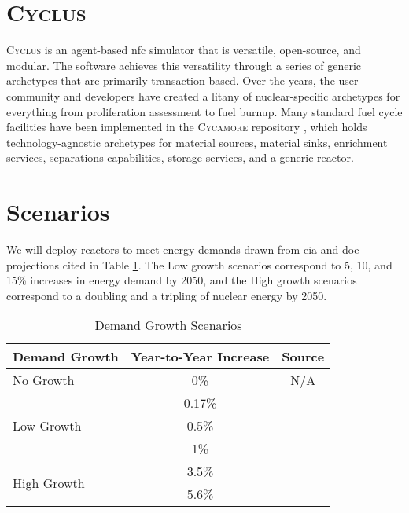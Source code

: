 \documentclass{anstrans}
\newcommand{\cycamore}{\textsc{Cycamore}\xspace}
\newcommand{\cyclus}{\textsc{Cyclus}\xspace}
\begin{document}
\section{\cyclus}

\cyclus \cite{huff_cyclus_intro_2016} is an agent-based \gls{nfc} simulator
that is versatile, open-source, and modular. The software achieves this
versatility through a series of generic archetypes that are primarily
transaction-based. Over the years, the user community and developers have
created a litany of nuclear-specific archetypes for everything from
proliferation assessment to fuel burnup. Many standard fuel cycle facilities
have been implemented in the \cycamore repository \cite{Carlsen_cycamore_2014},
which holds technology-agnostic archetypes for material sources, material
sinks, enrichment services, separations capabilities, storage services, and a
generic reactor.


\section{Scenarios}
We will deploy reactors to meet energy demands drawn from \gls{eia} and \gls{doe} projections cited in Table \ref{tab:demand_scenarios}. The Low growth scenarios correspond to 5, 10, and 15\% increases in energy demand by 2050, and the High growth scenarios correspond to a doubling and a tripling of nuclear energy by 2050.

\begin{table}[h]
  \centering
  \caption{Demand Growth Scenarios}
  \label{tab:demand_scenarios}
  \begin{tabular}{l c c}
      \hline
      \textbf{Demand Growth} & \textbf{Year-to-Year Increase} & \textbf{Source}\\
      \hline
      No Growth & 0\% & N/A\\
      \multirow{3}{*}{Low Growth} & 0.17\% & \cite{eia_aeo_2023}\\
       & 0.5\% & \cite{eia_aeo_2023}\\
       & 1\% & \cite{eia_aeo_2023}\\
       \multirow{2}{*}{High Growth} & 3.5\% & \cite{julie_liftoff_pathways_2024} \\
       & 5.6\% & \cite{julie_liftoff_pathways_2024}\\
      \hline
  \end{tabular}
\end{table}
\end{document}
